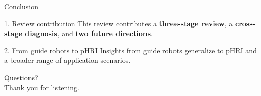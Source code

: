 \documentclass[aspectratio=169]{beamer}
\newcommand{\QApage}{%
        \begin{frame}[plain]
            \centering
            \vfill
            {\Huge Questions?}\\[0.8em]
            {\large Thank you for listening.}
            \vfill
        \end{frame}}
\newcommand{\keypoint}[1]{\textbf{\textcolor{phriBlue}{#1}}}
\begin{document}
\begin{frame}{Conclusion}
\begin{block}{1. Review contribution}
This review contributes a \keypoint{three-stage review}, a \keypoint{cross-stage diagnosis}, and \keypoint{two future directions}.
\end{block}

\begin{block}{2. From guide robots to pHRI}
Insights from guide robots generalize to pHRI and a broader range of application scenarios.
\end{block}
\end{frame}

\QApage
\end{document}
